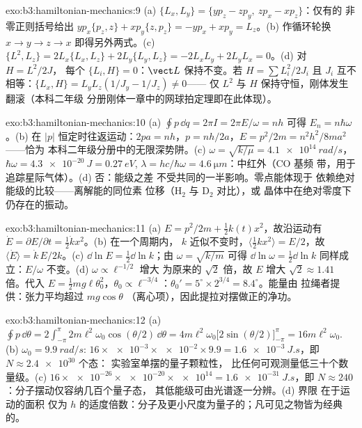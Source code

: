 \begin{solution}{exo:b3:hamiltonian-mechanics:9}
(a) $\{L_x, L_y\} = \{yp_z - zp_y,\ zp_x - xp_z\}$：仅有的
非零正则括号给出 $yp_x\{p_z, z\} + xp_y\{z,
p_z\} = -yp_x + xp_y = L_z$。(b) 作循环轮换 $x \to y \to z \to
x$ 即得另外两式。(c) $\{L^2, L_z\} = 2L_x\{L_x, L_z\} +
2L_y\{L_y, L_z\} = -2L_xL_y + 2L_yL_x = 0$。(d) 对 $H = L^2/2J$，
每个 $\{L_i, H\} = 0$：$\vect L$ 保持不变。若 $H = \sum L_i^2/2J_i$
且 $J_i$ 互不相等：$\{L_x, H\} = L_yL_z(1/J_y - 1/J_z) \neq 0$——
仅 $L^2$ 与 $H$ 保持守恒，刚体发生翻滚（本科二年级
分册刚体一章中的网球拍定理即在此体现）。
\end{solution}

\begin{solution}{exo:b3:hamiltonian-mechanics:10}
(a) $\oint p\,\dd q = 2\pi I = 2\pi E/\omega = nh$ 可得 $E_n =
n\hbar\omega$。(b) 在 $|p|$ 恒定时往返运动：$2pa = nh$，$p =
nh/2a$，$E = p^2/2m = n^2h^2/8ma^2$——恰为
本科二年级分册中的无限深势阱。(c) $\omega = \sqrt{k/\mu} = \qty{4.1e14}{rad/s}$，
$\hbar\omega = \qty{4.3e-20}{J} = \qty{0.27}{eV}$, $\lambda = hc/
\hbar\omega = \qty{4.6}{\micro m}$：中红外（CO 基频
带，用于追踪星际气体）。(d) 否：能级之差
不受共同的一半影响。零点能体现于
依赖绝对能级的比较——离解能的同位素
位移（H$_2$ 与 D$_2$ 对比），或
晶体中在绝对零度下仍存在的振动。
\end{solution}

\begin{solution}{exo:b3:hamiltonian-mechanics:11}
(a) $E = p^2/2m + \tfrac12 k(t)x^2$，故沿运动有 $\dot E =
\partial E/\partial t = \tfrac12\dot kx^2$。(b) 在一个周期内，
$k$ 近似不变时，$\langle\tfrac12 kx^2\rangle = E/2$，故
$\langle\dot E\rangle = \dot k\,E/2k$。(c) $\dd\ln E = \tfrac12\dd\ln
k$；由 $\omega = \sqrt{k/m}$ 可得 $\dd\ln\omega = \tfrac12\dd\ln k$
同样成立：$E/\omega$ 不变。(d) $\omega \propto \ell^{-1/2}$ 增大
为原来的 $\sqrt2$ 倍，故 $E$ 增大 $\sqrt2 \approx 1.41$ 倍。代入 $E = \tfrac12
mg\ell\theta_0^2$，$\theta_0 \propto \ell^{-3/4}$：$\theta_0' =
5^\circ \times 2^{3/4} = 8.4^\circ$。能量由
拉绳者提供：张力平均超过 $mg\cos\theta$
（离心项），因此提拉对摆做正的净功。
\end{solution}

\begin{solution}{exo:b3:hamiltonian-mechanics:12}
(a) $\oint p\,\dd\theta = 2\int_{-\pi}^{\pi}2m\ell^2\omega_0
\cos(\theta/2)\,\dd\theta = 4m\ell^2\omega_0\big[2\sin(\theta/2)
\big]_{-\pi}^{\pi} = 16m\ell^2\omega_0$. (b) $\omega_0 =
\qty{9.9}{rad/s}$: $16 \times \num{e-3} \times \num{e-2} \times 9.9 =
\qty{1.6e-3}{J.s}$，即 $N \approx \num{2.4e30}$ 个态：
实验室单摆的量子颗粒性，
比任何可观测量低三十个数量级。(c) $16 \times \num{e-26} \times
\num{e-20} \times \num{e14} = \qty{1.6e-31}{J.s}$，即 $N \approx
240$：分子摆动仅容纳几百个量子态，
其低能级可由光谱逐一分辨。(d) 界限
在于运动的面积
仅为 $h$ 的适度倍数：分子及更小尺度为量子的；凡可见之物皆为经典的。
\end{solution}

